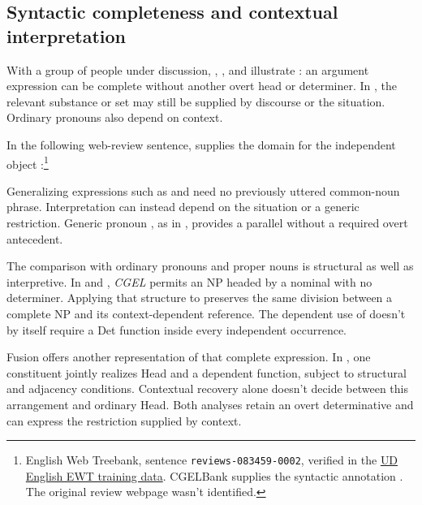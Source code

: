 \documentclass[12pt]{article}
\begin{document}
\subsection{Syntactic completeness and contextual interpretation}\label{sec:saturation}

With a group of people under discussion, , , and  illustrate : an argument expression can be complete without another overt head or determiner. In , the relevant substance or set may still be supplied by discourse or the situation. Ordinary pronouns also depend on context.

In the following web-review sentence,  supplies the domain for the independent object :\footnote{English Web Treebank, sentence \nolinkurl{reviews-083459-0002}, verified in the \href{https://github.com/UniversalDependencies/UD_English-EWT/blob/master/en_ewt-ud-train.conllu}{UD English EWT training data}. CGELBank supplies the syntactic annotation \citep{reynolds2023unified}. The original review webpage wasn't identified.}

\ea\label{ex:attested-both}
\z

Generalizing expressions such as  and  need no previously uttered common-noun phrase. Interpretation can instead depend on the situation or a generic restriction. Generic pronoun , as in , provides a parallel without a required overt antecedent.

The comparison with ordinary pronouns and proper nouns is structural as well as interpretive. In  and , \textit{CGEL} permits an NP headed by a nominal with no determiner. Applying that structure to  preserves the same division between a complete NP and its context-dependent reference. The dependent use of  doesn't by itself require a Det function inside every independent occurrence.

Fusion offers another representation of that complete expression. In \textcite{Payne2007}, one constituent jointly realizes Head and a dependent function, subject to structural and adjacency conditions. Contextual recovery alone doesn't decide between this arrangement and ordinary Head. Both analyses retain an overt determinative and can express the restriction supplied by context.
\end{document}
